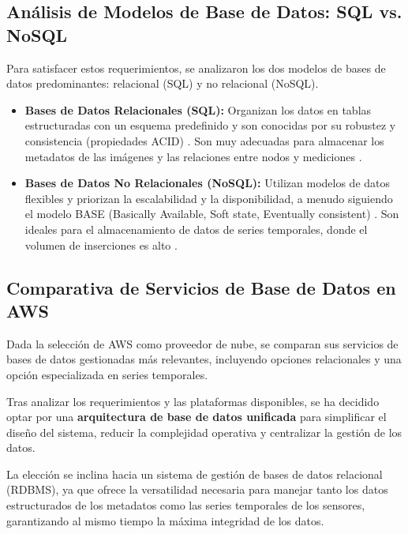 \subsection*{Análisis de Modelos de Base de Datos: SQL vs. NoSQL}

Para satisfacer estos requerimientos, se analizaron los dos modelos de bases de datos predominantes: relacional (SQL) y no relacional (NoSQL).

\begin{itemize}
    \item \textbf{Bases de Datos Relacionales (SQL):} Organizan los datos en tablas estructuradas con un esquema predefinido y son conocidas por su robustez y consistencia (propiedades ACID) \cite{oracle2024sql}. Son muy adecuadas para almacenar los metadatos de las imágenes y las relaciones entre nodos y mediciones \cite{mongodb2024sqlvsnosql}.
    \item \textbf{Bases de Datos No Relacionales (NoSQL):} Utilizan modelos de datos flexibles y priorizan la escalabilidad y la disponibilidad, a menudo siguiendo el modelo BASE (Basically Available, Soft state, Eventually consistent) \cite{mongodb2024sqlvsnosql}. Son ideales para el almacenamiento de datos de series temporales, donde el volumen de inserciones es alto \cite{aws2024sqlvsnosql}.
\end{itemize}

\subsection*{Comparativa de Servicios de Base de Datos en AWS}
\label{subsec:comparativa_db_aws}

Dada la selección de AWS como proveedor de nube, se comparan sus servicios de bases de datos gestionadas más relevantes, incluyendo opciones relacionales y una opción especializada en series temporales.



Tras analizar los requerimientos y las plataformas disponibles, se ha decidido optar por una \textbf{arquitectura de base de datos unificada} para simplificar el diseño del sistema, reducir la complejidad operativa y centralizar la gestión de los datos.

La elección se inclina hacia un sistema de gestión de bases de datos relacional (RDBMS), ya que ofrece la versatilidad necesaria para manejar tanto los datos estructurados de los metadatos como las series temporales de los sensores, garantizando al mismo tiempo la máxima integridad de los datos.

